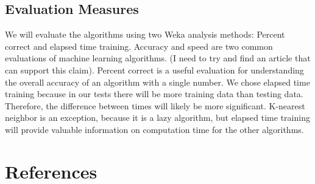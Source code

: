 \documentclass[11pt]{article} %
\begin{document}
\subsection{Evaluation Measures}
We will evaluate the algorithms using two Weka analysis methods: Percent correct and elapsed time training.  Accuracy and speed are two common evaluations of machine learning algorithms.  (I need to try and find an article that can support this claim).  Percent correct is a useful evaluation for understanding the overall accuracy of an algorithm with a single number.  We chose elapsed time training because in our tests there will be more training data than testing data.  Therefore, the difference between times will likely be more significant.  K-nearest neighbor is an exception, because it is a lazy algorithm, but elapsed time training will provide valuable information on computation time for the other algorithms.

\section{References}
\end{document}
